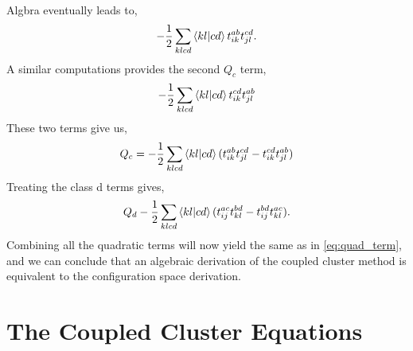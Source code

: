 Algbra eventually leads to,
\begin{equation}
    - \frac{1}{2} \sum_{klcd} \bra{kl} \ket{cd}
        t^{ab}_{ik} t^{cd}_{jl}.
\end{equation}
A similar computations provides the second $Q_c$ term,
\begin{equation}
    - \frac{1}{2} \sum_{klcd} \bra{kl} \ket{cd}
        t^{cd}_{ik} t^{ab}_{jl}
\end{equation}
These two terms give us,
\begin{equation}
    Q_c = - \frac{1}{2} \sum_{klcd} \bra{kl} \ket{cd}
        (t^{ab}_{ik}t^{cd}_{jl} - t^{cd}_{ik}t^{ab}_{jl})
\end{equation}
Treating the class d terms gives,
\begin{equation}
    Q_d - \frac{1}{2} \sum_{klcd} \bra{kl} \ket{cd}
        (t^{ac}_{ij}t^{bd}_{kl} - t^{bd}_{ij}t^{ac}_{kl}).
\end{equation}
Combining all the quadratic terms will now yield the same as in 
\autoref{eq:quad_term}, and we can conclude that an algebraic 
derivation of the coupled cluster method is equivalent to the 
configuration space derivation.

\section{The Coupled Cluster Equations}

